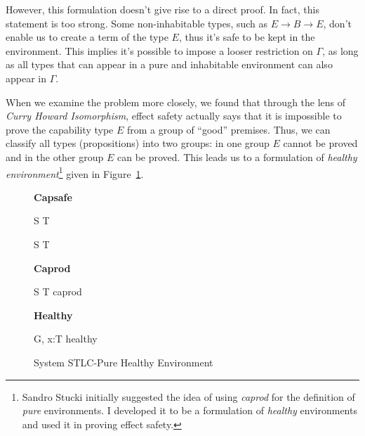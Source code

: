 However, this formulation doesn't give rise to a direct proof. In
fact, this statement is too strong. Some non-inhabitable types, such
as $E \to B \to E$, don't enable us to create a term of the type $E$,
thus it's safe to be kept in the environment. This implies it's
possible to impose a looser restriction on $\Gamma$, as long as all
types that can appear in a pure and inhabitable environment can also
appear in $\Gamma$.

When we examine the problem more closely, we found that through the
lens of \emph{Curry Howard Isomorphism}, effect safety actually says
that it is impossible to prove the capability type $E$ from a group of
``good'' premises. Thus, we can classify all types (propositions) into
two groups: in one group $E$ cannot be proved and in the other group
$E$ can be proved. This leads us to a formulation of \emph{healthy
  environment}\footnote{Sandro Stucki initially suggested the idea of
  using \emph{caprod} for the definition of \emph{pure}
  environments. I developed it to be a formulation of \emph{healthy}
  environments and used it in proving effect safety.} given in
Figure~\ref{fig:stlc-pure-healthy-definition}.

\begin{figure}[h]
\begin{framed}

\setlength{\columnseprule}{0.4pt}
\begin{multicols}{2}

\textbf{Capsafe}


{ S \to T \quad {} }

{ S \to T \quad {} }

\columnbreak

\textbf{Caprod}


{ S \to T \quad caprod }

\textbf{Healthy}


{ G, \; x:T \quad healthy }


\end{multicols}
\end{framed}

\caption{System STLC-Pure Healthy Environment}
\label{fig:stlc-pure-healthy-definition}
\end{figure}

